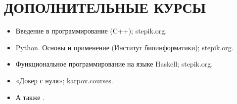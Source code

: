 \section{ДОПОЛНИТЕЛЬНЫЕ КУРСЫ}

    \begin{itemize}
        \setlength\itemsep{-.5em}
        \item Введение в программирование (C++); stepik.org.
        \item Python. Основы и применение (Институт биоинформатики); stepik.org.
        \item Функциональное программирование на языке Haskell; stepik.org.
        \item «Докер с нуля»; karpov.courses.
        \item А также .
    \end{itemize}
    
    \vspace{-.4em}
